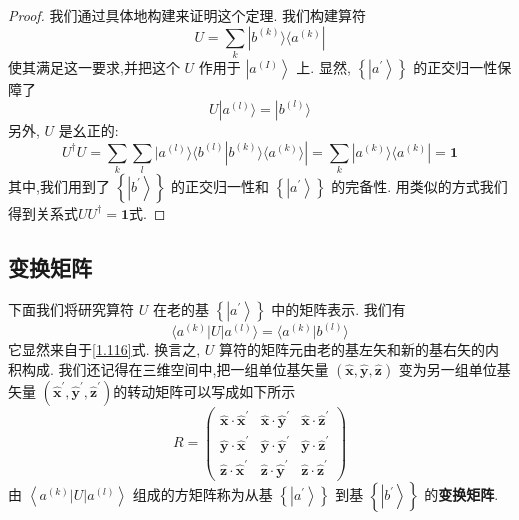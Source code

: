 \documentclass[lang=cn,newtx,10pt,scheme=chinese,thmcnt=section]{elegantbook}
\begin{document}
\begin{proof}
	我们通过具体地构建来证明这个定理. 我们构建算符
	\begin{equation}\label{1.115}
		U = \mathop{\sum }\limits_{k}| {b}^{( k) }\rangle \langle {a}^{( k) }|
	\end{equation}
	使其满足这一要求,并把这个 $U$ 作用于 $\left| {a}^{\left( I\right) }\right\rangle$ 上. 显然, $\left\{ \left| {a}^{\prime }\right\rangle \right\}$ 的正交归一性保障了
	\begin{equation}\label{1.116}
		U| {a}^{( l) }\rangle = | {b}^{( l) }\rangle
	\end{equation}
	另外, $U$ 是幺正的:
	\begin{equation}
		{U}^{ \dagger }U = \mathop{\sum }\limits_{k}\mathop{\sum }\limits_{l}| {a}^{( l) }\rangle \langle {{b}^{( l) }| {{b}^{( k) }\rangle \langle {a}^{( k) }\rangle }| = \mathop{\sum }\limits_{k}| {a}^{( k) }\rangle \langle {a}^{( k) }| = \textbf{1}}
	\end{equation}
	其中,我们用到了 $\left\{ \left| {b}^{\prime }\right\rangle \right\}$ 的正交归一性和 $\left\{ \left| {a}^{\prime }\right\rangle \right\}$ 的完备性. 用类似的方式我们得到关系式$U{U}^{ \dagger } = \textbf{1}$式.
\end{proof}
\subsection*{变换矩阵}
下面我们将研究算符 $U$ 在老的基 $\left\{ \left| {a}^{\prime }\right\rangle \right\}$ 中的矩阵表示. 我们有
\begin{equation}
	\langle {{a}^{\left( k\right) }\left| U\right| {a}^{\left( l\right) }}\rangle = \langle {{a}^{\left( k\right) } | {b}^{\left( l\right) }}\rangle
\end{equation}
它显然来自于\ref{1.116}式. 换言之, $U$ 算符的矩阵元由老的基左矢和新的基右矢的内积构成. 我们还记得在三维空间中,把一组单位基矢量 $\left( {\widehat{\mathbf{x}},\widehat{\mathbf{y}},\widehat{\mathbf{z}}}\right)$ 变为另一组单位基矢量 $\left( {{\widehat{\mathbf{x}}}^{\prime },{\widehat{\mathbf{y}}}^{\prime },{\widehat{\mathbf{z}}}^{\prime }}\right)$的转动矩阵可以写成如下所示
\begin{equation}
	R = \left( \begin{array}{lll} \widehat{\mathbf{x}} \cdot {\widehat{\mathbf{x}}}^{\prime } & \widehat{\mathbf{x}} \cdot {\widehat{\mathbf{y}}}^{\prime } & \widehat{\mathbf{x}} \cdot {\widehat{\mathbf{z}}}^{\prime } \\ \widehat{\mathbf{y}} \cdot {\widehat{\mathbf{x}}}^{\prime } & \widehat{\mathbf{y}} \cdot {\widehat{\mathbf{y}}}^{\prime } & \widehat{\mathbf{y}} \cdot {\widehat{\mathbf{z}}}^{\prime } \\ \widehat{\mathbf{z}} \cdot {\widehat{\mathbf{x}}}^{\prime } & \widehat{\mathbf{z}} \cdot {\widehat{\mathbf{y}}}^{\prime } & \widehat{\mathbf{z}} \cdot {\widehat{\mathbf{z}}}^{\prime } \end{array}\right)
\end{equation}
由 $\left\langle {{a}^{\left( k\right) }\left| U\right| {a}^{\left( l\right) }}\right\rangle$ 组成的方矩阵称为从基 $\left\{ \left| {a}^{\prime }\right\rangle \right\}$ 到基 $\left\{ \left| {b}^{\prime }\right\rangle \right\}$ 的\textbf{变换矩阵}.
\end{document}
